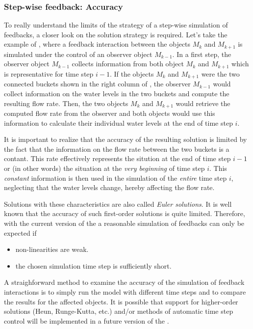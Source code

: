 \subsubsection*{Step-wise feedback: Accuracy}

To really understand the limits of the strategy of a step-wise simulation of feedbacks, a closer look on the solution strategy is required. Let's take the example of , where a feedback interaction between the objects $M_k$ and $M_{k+1}$ is simulated under the control of an observer object $M_{k-1}$. In a first step, the observer object $M_{k-1}$ collects information from both object $M_k$ and $M_{k+1}$ which is representative for time step $i-1$. If the objects $M_k$ and $M_{k+1}$ were the two connected buckets shown in the right column of , the observer $M_{k-1}$ would collect information on the water levels in the two buckets and compute the resulting flow rate. Then, the two objects $M_k$ and $M_{k+1}$ would retrieve the computed flow rate from the observer and both objects would use this information to calculate their individual water levels at the end of time step $i$.

It is important to realize that the accuracy of the resulting solution is limited by the fact that the information on the flow rate between the two buckets is a contant. This rate effectively represents the sitution at the end of time step $i-1$ or (in other words) the situation at the \emph{very beginning} of time step $i$. This \emph{constant} information is then used in the simulation of the \emph{entire} time step $i$, neglecting that the water levels change, hereby affecting the flow rate.

Solutions with these characteristics are also called \emph{Euler solutions}. It is well known that the accuracy of such first-order solutions is quite limited. Therefore, with the current version of the  a reasonable simulation of feedbacks can only be expected if
\begin{itemize}
  \item non-linearities are weak.
  \item the chosen simulation time step is sufficiently short.
\end{itemize}

A straighforward method to examine the accuracy of the simulation of feedback interactions is to simply run the model with different time steps and to compare the results for the affected objects. It is possible that support for higher-order solutions (Heun, Runge-Kutta, etc.) and/or methods of automatic time step control will be implemented in a future version of the .

